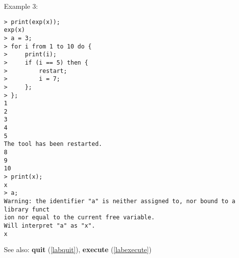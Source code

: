 \noindent Example 3: 
\begin{center}\begin{minipage}{15cm}\begin{Verbatim}[frame=single]
> print(exp(x));
exp(x)
> a = 3;
> for i from 1 to 10 do {
>     print(i);
>     if (i == 5) then {
>         restart;
>         i = 7;
>     };
> };
1
2
3
4
5
The tool has been restarted.
8
9
10
> print(x);
x
> a;
Warning: the identifier "a" is neither assigned to, nor bound to a library funct
ion nor equal to the current free variable.
Will interpret "a" as "x".
x
\end{Verbatim}
\end{minipage}\end{center}
See also: \textbf{quit} (\ref{labquit}), \textbf{execute} (\ref{labexecute})
